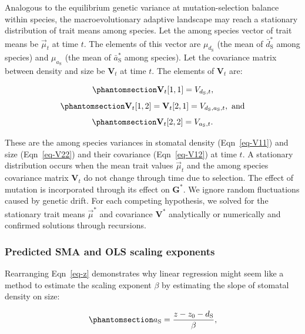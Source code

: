 \documentclass[
  letterpaper,
  DIV=11,
  numbers=noendperiod]{scrartcl}
\begin{document}
Analogous to the equilibrium genetic variance at mutation-selection
balance within species, the macroevolutionary adaptive landscape may
reach a stationary distribution of trait means among species. Let the
among species vector of trait means be \(\vec{\mu}_t\) at time \(t\).
The elements of this vector are \(\mu_{d_\mathrm{S}}\) (the mean of
\(\bar{d}^*_\mathrm{S}\) among species) and \(\mu_{a_\mathrm{S}}\) (the
mean of \(\bar{a}^*_\mathrm{S}\) among species). Let the covariance
matrix between density and size be \(\mathbf{V}_t\) at time \(t\). The
elements of \(\mathbf{V}_t\) are:

\begin{equation}\phantomsection\label{eq-V11}{\mathbf{V}_t[1,1] = V_{d_\mathrm{S},t},}\end{equation}
\begin{equation}\phantomsection\label{eq-V12}{\mathbf{V}_t[1,2] = \mathbf{V}_t[2,1] = V_{d_\mathrm{S},a_\mathrm{S},t},~\text{and}}\end{equation}
\begin{equation}\phantomsection\label{eq-V22}{\mathbf{V}_t[2,2] = V_{a_\mathrm{S},t}.}\end{equation}

These are the among species variances in stomatal density
(Eqn~\ref{eq-V11}) and size (Eqn~\ref{eq-V22}) and their covariance
(Eqn~\ref{eq-V12}) at time \(t\). A stationary distribution occurs when
the mean trait values \(\vec{\mu}_t\) and the among species covariance
matrix \(\mathbf{V}_t\) do not change through time due to selection. The
effect of mutation is incorporated through its effect on
\(\mathbf{G}^*\). We ignore random fluctuations caused by genetic drift.
For each competing hypothesis, we solved for the stationary trait means
\(\vec{\mu}^*\) and covariance \(\mathbf{V}^*\) analytically or
numerically and confirmed solutions through recursions.

\subsubsection{Predicted SMA and OLS scaling
exponents}\label{predicted-sma-and-ols-scaling-exponents}

Rearranging Eqn~\ref{eq-z} demonstrates why linear regression might seem
like a method to estimate the scaling exponent \(\beta\) by estimating
the slope of stomatal density on size:

\begin{equation}\phantomsection\label{eq-z1}{a_\mathrm{S} = \frac{z - z_0 - d_\mathrm{S}}{\beta},}\end{equation}
\end{document}
